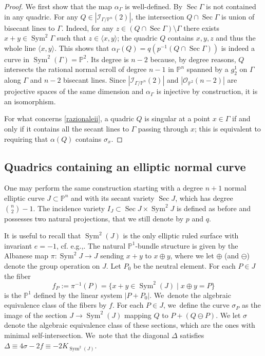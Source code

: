 \documentclass[11pt]{article}
\newcommand{\eg}{e.g.,\xspace}
\newcommand{\cf}{cf.\xspace}
\theoremstyle{plain}
\theoremstyle{definition}
\DeclareMathOperator{\Sec}{Sec}
\DeclareMathOperator{\Sym}{Sym}
\newcommand\PP{{\mathbb P}}
\newcommand\I{{\mathcal I}}
\let\+\oplus
\begin{document}
\begin{proof}
We first show that the map $\alpha_\Gamma$ is well-defined. By \cite{Ca} $\Sec\Gamma$ is not contained in any quadric. For any $Q\in |\I_{\Gamma/\PP^n}(2)|$, the intersection $Q\cap \Sec\Gamma$ is union of bisecant lines to $\Gamma$. Indeed, for any $z\in (Q\cap \Sec \Gamma)\setminus \Gamma$ there exists $x+y\in \Sym^2\Gamma$ such that $z\in \langle x,y\rangle$; the quadric $Q$ contains $x,y,z$ and thus the whole line $\langle x,y\rangle$. This shows that $\alpha_\Gamma (Q)=q(p^{-1}(Q\cap\Sec \Gamma))$ is indeed a curve in $\Sym^2(\Gamma)=\PP^2$. Its degree is $n-2$ because, by degree reasons, $Q$ intersects the rational normal scroll of degree $n-1$ in $\PP^n$ spanned by a $g^1_2$ on $\Gamma$ along $\Gamma$ and $n-2$ bisecant lines. Since $|\I_{\Gamma/\PP^n}(2)|$ and $|\mathcal O_{\PP^2}(n-2)|$ are projective spaces of the same dimension and $\alpha_\Gamma$ is injective by construction, it is an isomorphism.

For what concerns \eqref{razionaleii}, a quadric $Q$ is singular at a point $x\in \Gamma$ if and only if it contains all the secant lines to $\Gamma$ passing through $x$; this is equivalent to requiring that $\alpha(Q)$ contains $\sigma _x$.
\end{proof}

\subsection{Quadrics containing an elliptic normal curve}

One may perform the same construction starting with a degree $n+1$ normal elliptic curve $J\subset \PP^n$ and with its secant variety $\Sec J$, which has degree $\binom{n}{2} -1$. The incidence variety \hbox{$I_J\subset \Sec J\times \Sym^2J$} is defined as before and possesses two natural projections, that we still denote by $p$ and $q$.

It is useful to recall that $\Sym^2(J)$ is the only elliptic ruled surface with invariant $e=-1$, \cf \eg \cite{CaCi}. The natural $\PP^1$-bundle structure is given by the Albanese map $\pi: \Sym^2 J \to J$ sending $x+y$ to $x\+ y$, where we let $\+$ (and $\ominus$) denote the group operation on $J$. Let $P_0$ be the neutral element. For each $P \in J$ the fiber
\[
 f_P:=\pi^{-1}(P)=\{ x+y \in \Sym^2(J) \mid x\+ y=P\}
\]
is the $\PP^1$ defined by the linear system $|P+P_0|$. We~denote the algebraic equivalence class of the fibers by $f$.
For each $P \in J$, we~define the curve $\sigma_P$
as the image of the section $J \to \Sym^2(J)$ mapping $Q$ to $P+ (Q \ominus P)$.
We let $\sigma$ denote the algebraic equivalence class of these sections, which are the ones with minimal self-intersection. We~note that the diagonal $\Delta$ satisfies $\Delta \equiv 4\sigma-2f\equiv -2K_{\Sym^2(J)}$.
\end{document}
